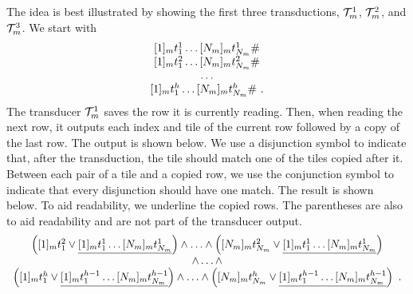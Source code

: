 The idea is best illustrated by showing the first three transductions,
$\mathcal{T}^1_m$, $\mathcal{T}^2_m$, and $\mathcal{T}^3_m$.
We start with
\[
    \begin{array}{c}
        \fullrow{1} \spacer \\
        \fullrow{2} \spacer \\
        \ldots \\
        \fullrow{\tileheight} \spacer \ .
    \end{array}
\]
The transducer $\mathcal{T}^1_m$ saves the row it is currently reading.
Then, when reading the next row, it outputs each index and tile of the current
row followed by a copy of the last row. The output is shown below. We use a
disjunction symbol to indicate that, after the transduction, the tile should
match one of the tiles copied after it. Between each pair of a tile and a
copied row, we use the conjunction symbol to indicate that every disjunction
should have one match. The result is shown below. To aid readability, we
underline the copied rows.  The parentheses are also to aid readability and are
not part of the transducer output.
\[
    \begin{array}{c}
        \left(
            [1]_{m} t^2_1
                \lor
                \underline{[1]_{m} t^{1}_1 \ldots [N_{m}]_{m} t^{1}_{N_{m}}}
        \right)
        \land
        \ldots
        \land
        \left(
            [N_{m}]_{m} t^2_{N_{m}}
                \lor
                \underline{[1]_{m} t^{1}_1 \ldots [N_{m}]_{m} t^{1}_{N_{m}}}
        \right) \\
        \land \ldots \land \\
        \left(
            [1]_{m} t^h_1
                \lor
                \underline{[1]_{m} t^{h-1}_1 \ldots [N_{m}]_{m} t^{h-1}_{N_{m}}}
        \right)
        \land
        \ldots
        \land
        \left(
            [N_{m}]_{m}
                t^h_{N_{m}}
                \lor
                \underline{[1]_{m} t^{h-1}_1 \ldots [N_{m}]_{m} t^{h-1}_{N_{m}}}
        \right) \ .\\
    \end{array}
\]

